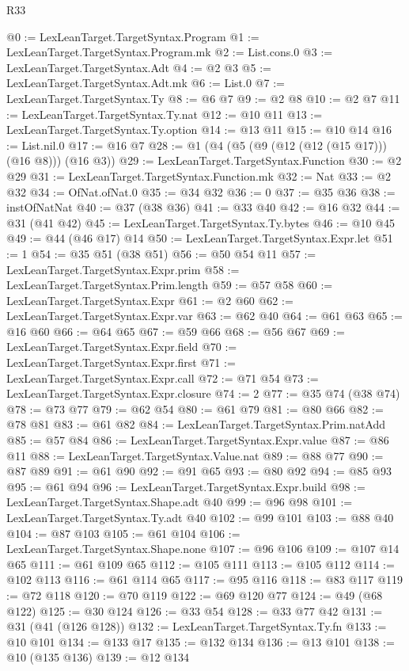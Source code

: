 \begin{lexlean}{R33}
\begin{coremodule}
@0 := LexLeanTarget.TargetSyntax.Program
@1 := LexLeanTarget.TargetSyntax.Program.mk
@2 := List.cons.{0}
@3 := LexLeanTarget.TargetSyntax.Adt
@4 := @2 @3
@5 := LexLeanTarget.TargetSyntax.Adt.mk
@6 := List.{0}
@7 := LexLeanTarget.TargetSyntax.Ty
@8 := @6 @7
@9 := @2 @8
@10 := @2 @7
@11 := LexLeanTarget.TargetSyntax.Ty.nat
@12 := @10 @11
@13 := LexLeanTarget.TargetSyntax.Ty.option
@14 := @13 @11
@15 := @10 @14
@16 := List.nil.{0}
@17 := @16 @7
@28 := @1 (@4 (@5 (@9 (@12 (@12 (@15 @17))) (@16 @8))) (@16 @3))
@29 := LexLeanTarget.TargetSyntax.Function
@30 := @2 @29
@31 := LexLeanTarget.TargetSyntax.Function.mk
@32 := Nat
@33 := @2 @32
@34 := OfNat.ofNat.{0}
@35 := @34 @32
@36 := 0
@37 := @35 @36
@38 := instOfNatNat
@40 := @37 (@38 @36)
@41 := @33 @40
@42 := @16 @32
@44 := @31 (@41 @42)
@45 := LexLeanTarget.TargetSyntax.Ty.bytes
@46 := @10 @45
@49 := @44 (@46 @17) @14
@50 := LexLeanTarget.TargetSyntax.Expr.let
@51 := 1
@54 := @35 @51 (@38 @51)
@56 := @50 @54 @11
@57 := LexLeanTarget.TargetSyntax.Expr.prim
@58 := LexLeanTarget.TargetSyntax.Prim.length
@59 := @57 @58
@60 := LexLeanTarget.TargetSyntax.Expr
@61 := @2 @60
@62 := LexLeanTarget.TargetSyntax.Expr.var
@63 := @62 @40
@64 := @61 @63
@65 := @16 @60
@66 := @64 @65
@67 := @59 @66
@68 := @56 @67
@69 := LexLeanTarget.TargetSyntax.Expr.field
@70 := LexLeanTarget.TargetSyntax.Expr.first
@71 := LexLeanTarget.TargetSyntax.Expr.call
@72 := @71 @54
@73 := LexLeanTarget.TargetSyntax.Expr.closure
@74 := 2
@77 := @35 @74 (@38 @74)
@78 := @73 @77
@79 := @62 @54
@80 := @61 @79
@81 := @80 @66
@82 := @78 @81
@83 := @61 @82
@84 := LexLeanTarget.TargetSyntax.Prim.natAdd
@85 := @57 @84
@86 := LexLeanTarget.TargetSyntax.Expr.value
@87 := @86 @11
@88 := LexLeanTarget.TargetSyntax.Value.nat
@89 := @88 @77
@90 := @87 @89
@91 := @61 @90
@92 := @91 @65
@93 := @80 @92
@94 := @85 @93
@95 := @61 @94
@96 := LexLeanTarget.TargetSyntax.Expr.build
@98 := LexLeanTarget.TargetSyntax.Shape.adt @40
@99 := @96 @98
@101 := LexLeanTarget.TargetSyntax.Ty.adt @40
@102 := @99 @101
@103 := @88 @40
@104 := @87 @103
@105 := @61 @104
@106 := LexLeanTarget.TargetSyntax.Shape.none
@107 := @96 @106
@109 := @107 @14 @65
@111 := @61 @109 @65
@112 := @105 @111
@113 := @105 @112
@114 := @102 @113
@116 := @61 @114 @65
@117 := @95 @116
@118 := @83 @117
@119 := @72 @118
@120 := @70 @119
@122 := @69 @120 @77
@124 := @49 (@68 @122)
@125 := @30 @124
@126 := @33 @54
@128 := @33 @77 @42
@131 := @31 (@41 (@126 @128))
@132 := LexLeanTarget.TargetSyntax.Ty.fn
@133 := @10 @101
@134 := @133 @17
@135 := @132 @134
@136 := @13 @101
@138 := @10 (@135 @136)
@139 := @12 @134

\end{coremodule}
\end{lexlean}
